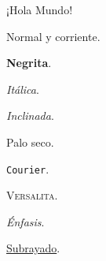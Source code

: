 \documentclass[varwidth,margin=.2cm]{standalone}
\begin{document}
¡Hola Mundo!

\tiny\textrm{Normal y corriente}.

\scriptsize\textbf{Negrita}.

\footnotesize\textit{Itálica}.

\small\textsl{Inclinada}.

\large\textsf{Palo seco}.

\Large\texttt{Courier}.

\LARGE\textsc{Versalita}.

\huge\emph{Énfasis}.

\Huge\underline{Subrayado}.
\end{document}
